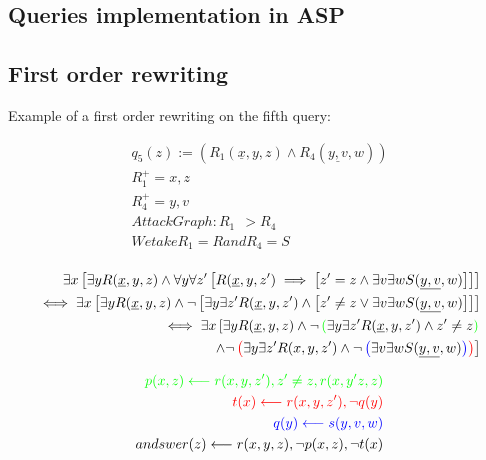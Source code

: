 \documentclass[acmsmall]{acmart}
\begin{document}
\begin{CCSXML}


\section{Queries implementation in ASP}

\subsection{First order rewriting}

Example of a first order rewriting on the fifth query:


\begin{align*}
	q_5(z)   :=  (R_1(\underline{x},y,z) \wedge R_4(\underline{y,v}, w))\\
	R_1^+ = x,z\\
	R_4^+ = y,v\\
	Attack Graph:  R_1 ~~> R_4\\
	We take R_1 = R and R_4 = S\\
\end{align*}



\begin{align*}
	\exists x \left[ \exists y R(\underline{x},y,z) \wedge \forall y \forall z' \left[ R(\underline{x},y,z') \implies \left[ z' = z \wedge \exists v \exists w S(\underline{y,v},w) \right] \right] \right]\\
	\iff \exists x \left[ \exists y R(\underline{x},y,z) \wedge \neg \left[ \exists y \exists z' R(\underline{x},y,z') \wedge \left[ z' \ne z  \lor \exists v \exists w S(\underline{y,v},w) \right] \right] \right]\\
	\iff \exists x \left[ \exists y R(\underline{x},y,z) \wedge \neg  \color{green}\left(\color{savedleftcolor}  \exists y \exists z' R(\underline{x},y,z') \land z' \ne z \color{green}\right) \right. \\
	 \left. \land \neg \color{red}\left(\color{savedleftcolor} \exists y \exists z' R(x,y,z') \land \neg \color{blue}\left(\color{savedleftcolor} \exists v \exists w S(\underline{y,v},w) \color{blue}\right) \color{red}\right)\color{savedleftcolor} \right] \\
\end{align*}

\begin{align*}
	\color{green}p(x,z) \longleftarrow r(x,y,z') , z' \ne z, r(x,y'z,z)\\
	\color{red}t(x) \longleftarrow r(x,y,z') , \neg q(y)\\
	\color{blue}q(y) \longleftarrow s(y,v,w)\\
	andswer(z) \longleftarrow r(x,y,z), \neg p(x,z), \neg t(x)\\
\end{align*}


\end{CCSXML}
\end{document}
